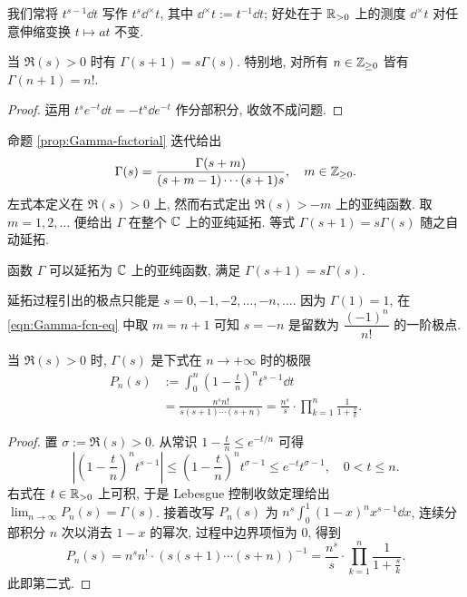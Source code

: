 \begin{convention}
	我们常将 $t^{s-1} \dd t$ 写作 $t^s \dd^\times t$, 其中 $\dd^\times t := t^{-1} \dd t$; 好处在于 $\mathbb{R}_{>0}$ 上的测度 $\dd^\times t$ 对任意伸缩变换 $t \mapsto at$ 不变.
\end{convention}

\begin{proposition}\label{prop:Gamma-factorial}
	当 $\Re(s) > 0$ 时有 $\Gamma(s+1) = s\Gamma(s)$. 特别地, 对所有 $n \in \mathbb{Z}_{\geq 0}$ 皆有 $\Gamma(n+1) = n!$.
\end{proposition}
\begin{proof}
	运用 $t^s e^{-t}\dd t = - t^s \dd e^{-t}$ 作分部积分, 收敛不成问题.
\end{proof}

命题 \ref{prop:Gamma-factorial} 迭代给出
\begin{equation}\label{eqn:Gamma-fcn-eq}
	\Gamma(s) = \frac{\Gamma(s+m)}{(s+m-1) \cdots (s+1) s}, \quad m \in \mathbb{Z}_{\geq 0}.
\end{equation}
左式本定义在 $\Re(s) > 0$ 上, 然而右式定出 $\Re(s) > -m$ 上的亚纯函数. 取 $m = 1,2, \ldots$ 便给出 $\Gamma$ 在整个 $\mathbb{C}$ 上的亚纯延拓. 等式 $\Gamma(s+1) = s\Gamma(s)$ 随之自动延拓.

\begin{corollary}
	函数 $\Gamma$ 可以延拓为 $\mathbb{C}$ 上的亚纯函数, 满足 $\Gamma(s + 1) = s\Gamma(s)$.
\end{corollary}

延拓过程引出的极点只能是 $s=0,-1,-2, \ldots, -n, \ldots$. 因为 $\Gamma(1) = 1$, 在 \eqref{eqn:Gamma-fcn-eq} 中取 $m=n+1$ 可知 $s = -n$ 是留数为 $\dfrac{(-1)^n}{n!}$ 的一阶极点.

\begin{lemma}\label{prop:Gamma-approx}
	当 $\Re(s) > 0$ 时, $\Gamma(s)$ 是下式在 $n \to +\infty$ 时的极限
	\begin{align*}
		P_n(s) & := \int_0^n \left( 1 - \frac{t}{n} \right)^n t^{s-1} \dd t \\
		& = \frac{n^s n!}{s(s+1) \cdots (s+n)} = \frac{n^s}{s} \cdot \prod_{k=1}^n \frac{1}{1 + \frac{s}{k}}.
	\end{align*}
\end{lemma}
\begin{proof}
	置 $\sigma := \Re(s) > 0$. 从常识 $1 - \frac{t}{n} \leq e^{-t/n}$ 可得
	\[ \left| \left( 1 - \frac{t}{n} \right)^n t^{s-1} \right| \leq \left(1 - \frac{t}{n} \right)^n t^{\sigma-1} \leq e^{-t} t^{\sigma-1}, \quad 0 < t \leq n . \]
	右式在 $t \in \mathbb{R}_{> 0}$ 上可积, 于是 Lebesgue 控制收敛定理给出 $\lim_{n \to \infty} P_n(s) = \Gamma(s)$. 接着改写 $P_n(s)$ 为 $n^s \int_0^1 (1-x)^n x^{s-1} \dd x$, 连续分部积分 $n$ 次以消去 $1-x$ 的幂次, 过程中边界项恒为 $0$, 得到
	\[ P_n(s) = n^s n^! \cdot (s(s+1) \cdots (s+n))^{-1} = \frac{n^s}{s} \cdot \prod_{k=1}^n \frac{1}{1 + \frac{s}{k}}. \]
	此即第二式.
\end{proof}

